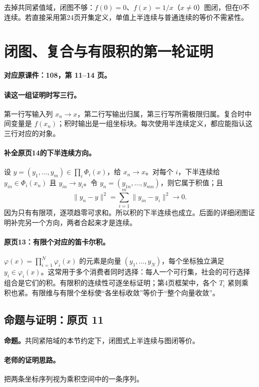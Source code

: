 去掉共同紧值域，闭图不够：$f(0)=0$、$f(x)=1/x$（$x\ne0$）图闭，但在0不连续。若直接采用第24页开集定义，单值上半连续与普通连续的等价不需紧性。



\clearpage\section{闭图、复合与有限积的第一轮证明}\label{g:108:11}

\textbf{对应原课件：108，第 11--14 页。}


\paragraph{读这一组证明时写三行。}
第一行写输入列 $x_n\to x$，第二行写输出归属，第三行写所需极限归属。复合时中间变量是 $f(x_n)$；积时输出是一组坐标块。每次使用半连续定义，都应能指认这三行对应的对象。
\paragraph{补全原页14的下半连续方向。}
设 $y=(y_1,\ldots,y_m)\in\prod_i\Phi_i(x)$，给 $x_n\to x$。对每个 $i$，下半连续给 $y_{in}\in\Phi_i(x_n)$ 且 $y_{in}\to y_i$。令 $y_n=(y_{1n},\ldots,y_{mn})$，则它属于积值；且
\[\|y_n-y\|^2=\sum_{i=1}^m\|y_{in}-y_i\|^2\longrightarrow0.\]
因为只有有限项，逐项趋零可求和。所以积的下半连续也成立。后面的详细闭图证明补完另一个方向，两者合起来才是连续。


\paragraph{原页13：有限个对应的笛卡尔积。}$\varphi(x)=\prod_{i=1}^N\varphi_i(x)$ 的元素是向量 $(y_1,\ldots,y_N)$，每个坐标独立满足 $y_i\in\varphi_i(x)$。这常用于多个消费者同时选择：每人一个可行集，社会的可行选择组合是它们的积。有限积的连续性可逐坐标证明；第4页框架中，各个 $T_i$ 紧则乘积也紧。有限维与有限个坐标使“各坐标收敛”等价于“整个向量收敛”。



\subsection{命题与证明：原页 11}

\textbf{命题。}共同紧陪域的本节约定下，闭图式上半连续与图闭等价。

\paragraph{老师的证明思路。}把两条坐标序列视为乘积空间中的一条序列。

